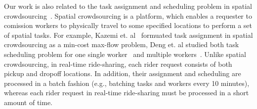Our work is also related to the task assignment and scheduling problem in spatial crowdsourcing~\cite{KazemiGis12, DengGis13, DengGis15}. Spatial crowdsourcing is a platform, which enables a requester to comission workers to physically travel to some specified locations to perform a set of spatial tasks. For example, Kazemi et. al~\cite{KazemiGis12} formuated task assignment in spatial crowdsourcing as a min-cost max-flow problem, Deng et. al studied both task scheduling problem for one single worker~\cite{DengGis13} and multiple workers~\cite{DengGis15}. Unlike spatial crowdsourcing, in real-time ride-sharing, each rider request consists of both pickup and dropoff locations. In addition, their assignment and scheduling are processed in a batch fashion (e.g., batching tasks and workers every 10 minutes), whereas each rider request in real-time ride-sharing must be processed in a short amount of time.
\vspace{-0.1in}